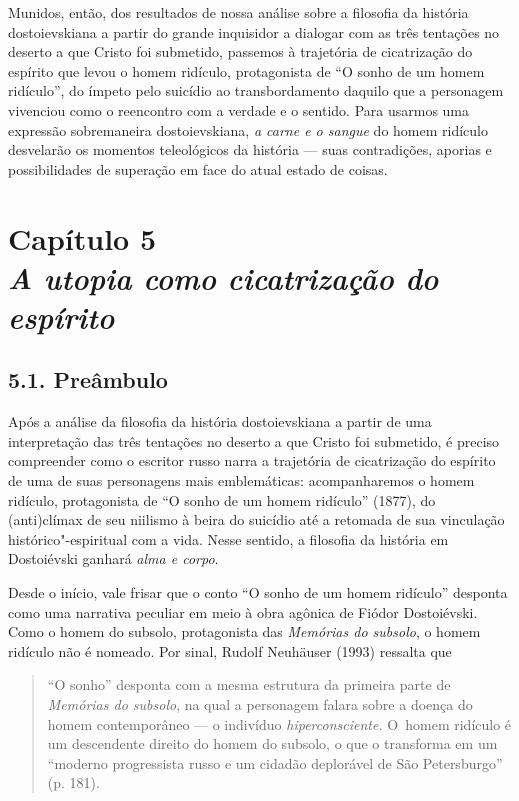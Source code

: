 Munidos, então, dos resultados de nossa análise sobre a filosofia da
história dostoievskiana a partir do grande inquisidor a dialogar com as
três tentações no deserto a que Cristo foi submetido, passemos à
trajetória de cicatrização do espírito que levou o homem ridículo,
protagonista de ``O sonho de um homem ridículo'', do ímpeto pelo
suicídio ao transbordamento daquilo que a personagem vivenciou como o
reencontro com a verdade e o sentido. Para usarmos uma expressão
sobremaneira dostoievskiana, \emph{a carne e o sangue} do homem ridículo
desvelarão os momentos teleológicos da história --- suas contradições,
aporias e possibilidades de superação em face do atual estado de coisas.

\chapter*{Capítulo 5\\
\bigskip
\emph{A utopia como cicatrização do espírito}}


\section{5.1. Preâmbulo}

Após a análise da filosofia da história dostoievskiana a partir de uma
interpretação das três tentações no deserto a que Cristo foi submetido,
é preciso compreender como o escritor russo narra a trajetória de
cicatrização do espírito de uma de suas personagens mais emblemáticas:
acompanharemos o homem ridículo, protagonista de ``O sonho de um homem
ridículo'' (1877), do (anti)clímax de seu niilismo à beira do suicídio
até a retomada de sua vinculação histórico"-espiritual com a vida. Nesse
sentido, a filosofia da história em Dostoiévski ganhará \emph{alma e
corpo}.

Desde o início, vale frisar que o conto ``O sonho de um homem ridículo''
desponta como uma narrativa peculiar em meio à obra agônica de Fiódor
Dostoiévski. Como o homem do subsolo, protagonista das \emph{Memórias do
subsolo}, o homem ridículo não é nomeado. Por sinal, Rudolf Neuhäuser
(1993) ressalta que

\begin{quote}
``O sonho'' desponta com a mesma estrutura da primeira parte de
\emph{Memórias do subsolo}, na qual a personagem falara sobre a doença
do homem contemporâneo --- o indivíduo \emph{hiperconsciente.} O~homem
ridículo é um descendente direito do homem do subsolo, o que o
transforma em um ``moderno progressista russo e um cidadão deplorável de
São Petersburgo'' (p. 181).
\end{quote}

